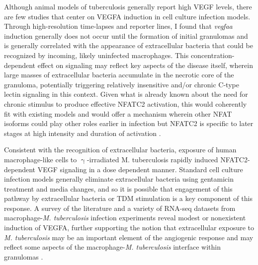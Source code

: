 Although animal models of tuberculosis generally report high VEGF levels, there are few studies that center on VEGFA induction in cell culture infection models. Through high\hyp{}resolution time\hyp{}lapses and reporter lines, I found that \textit{vegfaa} induction generally does not occur until the formation of initial granulomas and is generally correlated with the appearance of extracellular bacteria that could be recognized by incoming, likely uninfected macrophages. This concentration\hyp{}dependent effect on signaling may reflect key aspects of the disease itself, wherein large masses of extracellular bacteria accumulate in the necrotic core of the granuloma, potentially triggering relatively insensitive and/or chronic C\hyp{}type lectin signaling in this context. Given what is already known about the need for chronic stimulus to produce effective NFATC2 activation, this would coherently fit with existing models and would offer a mechanism wherein other NFAT isoforms could play other roles earlier in infection but NFATC2 is specific to later stages at high intensity and duration of activation \citep{Yissachar2013, Kar2015}. 

Consistent with the recognition of extracellular bacteria, exposure of human macrophage\hyp{}like cells to $\upgamma$\hyp{}irradiated M. tuberculosis rapidly induced NFATC2\hyp{}dependent VEGF signaling in a dose dependent manner. Standard cell culture infection models generally eliminate extracellular bacteria using gentamicin treatment and media changes, and so it is possible that engagement of this pathway by extracellular bacteria or TDM stimulation is a key component of this response. A survey of the literature and a variety \citep{Lee2019, Pisu2020, Hall2021, Looney2021, Pu2021} of RNA\hyp{}seq datasets from macrophage\hyp{}\textit{M. tuberculosis} infection experiments reveal modest or nonexistent induction of VEGFA, further supporting the notion that extracellular exposure to \textit{M. tuberculosis} may be an important element of the angiogenic response and may reflect some aspects of the macrophage\hyp{}\textit{M. tuberculosis} interface within granulomas \citep{Orme2014b}.

